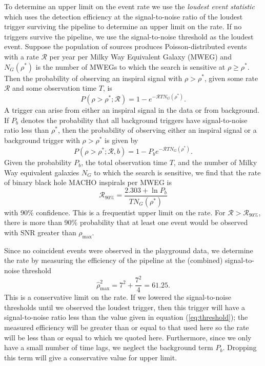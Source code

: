 To determine an upper limit on the event rate we use the \emph{loudest event
statistic}\cite{loudestGWDAW03} which uses the detection efficiency at the
signal-to-noise ratio of the loudest trigger surviving the pipeline to
determine an upper limit on the rate. If no triggers survive the pipeline, we
use the signal-to-noise threshold as the loudest event.  Suppose the
population of sources produces Poisson-distributed events with a rate
$\mathcal{R}$ per year per Milky Way Equivalent Galaxy (MWEG) and
$N_G(\rho^\ast)$ is the number of MWEGs to which the search is sensitive at
$\rho \geq \rho^\ast$.   Then the probability of observing an inspiral signal
with $\rho > \rho^\ast$, given some rate $\mathcal{R}$ and some observation
time $T$, is
\begin{equation}
P(\rho>\rho^\ast;{\mathcal{R}}) = 1 - e^{-{\mathcal{R}}T N_G(\rho^\ast)}.
\label{eq:foreground-poisson}
\end{equation}
A trigger can arise from either an inspiral signal in the data or from
background.   If $P_b$ denotes the probability that all background triggers
have signal-to-noise ratio less than $\rho^\ast$,  then the probability of observing either an
inspiral signal or a background trigger with $\rho > \rho^\ast$ is given by
\begin{equation}
P(\rho>\rho^\ast;{\mathcal{R}},b) = 1 - P_b e^{-{\mathcal{R}}TN_G(\rho^\ast)}.
\label{eq:joint-dist}
\end{equation}
Given the probability $P_b$, the total observation time $T$, and the number of
Milky Way equivalent galaxies $N_{{G}}$ to which the search is sensitive, we
find that the rate of binary black hole MACHO inspirals per MWEG is
\begin{equation}
  \mathcal{R}_{90\%} = \frac{2.303+\ln P_b}{T N_{G}(\rho^\ast)}
\end{equation}
with 90\% confidence. This is a frequentist upper limit on the rate.
For ${\mathcal{R}}>{\mathcal{R}}_{90\%}$, there is more than $90\%$
probability that at least one event would be observed with SNR greater
than $\rho_{\text{max}}$. 

Since no coincident events were observed in the playground data, we determine
the rate by measuring the efficiency of the pipeline at the (combined)
signal-to-noise threshold
\begin{equation}
\hat{\rho}^2_\mathrm{max} =  7^2 + \frac{7^2}{4} = 61.25.
\label{eq:threshold}
\end{equation}
This is a conservative limit on the rate. If we lowered the
signal-to-noise thresholds until we observed the loudest trigger, then this
trigger will have a signal-to-noise ratio less than the value given in equation
(\ref{eq:threshold}); the measured efficiency will be greater than or equal to
that used here so the rate will be less than or equal to which we
quoted here. Furthermore, since we only have a small number of time lags, we
neglect the background term $P_b$. Dropping this term will give a conservative
value for upper limit\cite{loudestGWDAW03}.

